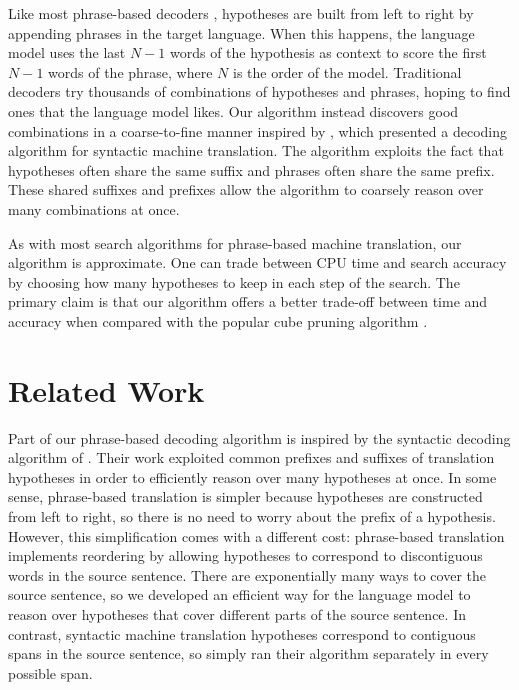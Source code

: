 \documentclass[11pt]{article}
\begin{document}
Like most phrase-based decoders \cite{pharaoh}, hypotheses are built from left to right by appending phrases in the target language.  When this happens, the language model uses the last $N-1$ words of the hypothesis as context to score the first $N-1$ words of the phrase, where $N$ is the order of the model.  Traditional decoders \cite{cubepruning} try thousands of combinations of hypotheses and phrases, hoping to find ones that the language model likes.  Our algorithm instead discovers good combinations in a coarse-to-fine manner inspired by , which presented a decoding algorithm for syntactic machine translation.  The algorithm exploits the fact that hypotheses often share the same suffix and phrases often share the same prefix.  These shared suffixes and prefixes allow the algorithm to coarsely reason over many combinations at once.   


As with most search algorithms for phrase-based machine translation, our algorithm is approximate.  One can trade between CPU time and search accuracy by choosing how many hypotheses to keep in each step of the search.  The primary claim is that our algorithm offers a better trade-off between time and accuracy when compared with the popular cube pruning algorithm \cite{cubepruning}.  

\section{Related Work}
Part of our phrase-based decoding algorithm is inspired by the syntactic decoding algorithm of .  Their work exploited common prefixes and suffixes of translation hypotheses in order to efficiently reason over many hypotheses at once.  In some sense, phrase-based translation is simpler because hypotheses are constructed from left to right, so there is no need to worry about the prefix of a hypothesis.  However, this simplification comes with a different cost: phrase-based translation implements reordering by allowing hypotheses to correspond to discontiguous words in the source sentence.  There are exponentially many ways to cover the source sentence, so we developed an efficient way for the language model to reason over hypotheses that cover different parts of the source sentence.  In contrast, syntactic machine translation hypotheses correspond to contiguous spans in the source sentence, so  simply ran their algorithm separately in every possible span.  
\end{document}
